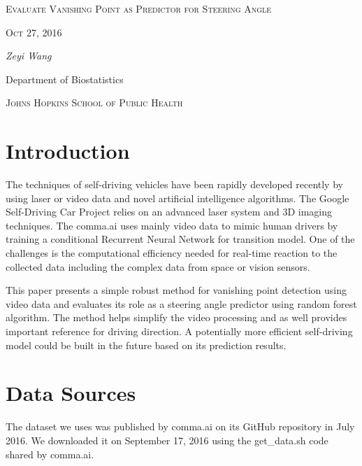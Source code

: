 \documentclass[11pt, oneside]{article}
\begin{document}
\begin{titlepage}
	\centering
	{\scshape\LARGE Evaluate Vanishing Point as Predictor for Steering Angle \par}
	\vspace{1cm}
	{\scshape\Large Oct 27, 2016\par}
	\vspace{2cm}
	{\Large\itshape Zeyi Wang\par}
	Department of Biostatistics\par
	\textsc{Johns Hopkins School of Public Health}

	\vfill

\end{titlepage}



\section*{Introduction}

The techniques of self-driving vehicles have been rapidly developed recently by using laser or video data and novel artificial intelligence algorithms. The Google Self-Driving Car Project 
\cite{google} relies on an advanced laser system and 3D imaging techniques. The comma.ai
\cite{comma.ai} 
uses mainly video data to mimic human drivers by 
training a conditional Recurrent Neural Network for transition model. 
One of the challenges is the computational efficiency needed for real-time reaction to the collected data including the complex data from space or vision sensors. 

This paper presents a simple robust method for vanishing point detection using video data and evaluates its role as a steering angle predictor using random forest algorithm. The method helps simplify the video processing and as well provides important reference for driving direction. A potentially more efficient self-driving model could be built in the future based on its prediction results. 

\section*{Data Sources}

The dataset we uses was published by comma.ai on its GitHub repository in July 2016. We downloaded it on September 17, 2016 using the get\_data.sh code shared by comma.ai. 
\end{document}
